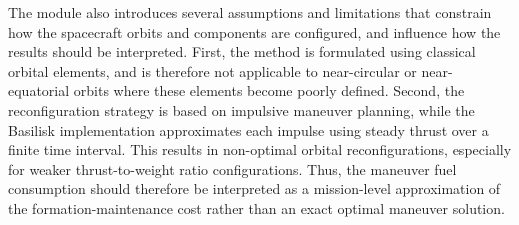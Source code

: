 The module also introduces several assumptions and limitations that constrain how the spacecraft orbits and components are configured, and influence how the results should be interpreted. First, the method is formulated using classical orbital elements, and is therefore not applicable to near-circular or near-equatorial orbits where these elements become poorly defined. Second, the reconfiguration strategy is based on impulsive maneuver planning, while the Basilisk implementation approximates each impulse using steady thrust over a finite time interval. This results in non-optimal orbital reconfigurations, especially for weaker thrust-to-weight ratio configurations. Thus, the maneuver fuel consumption should therefore be interpreted as a mission-level approximation of the formation-maintenance cost rather than an exact optimal maneuver solution.

